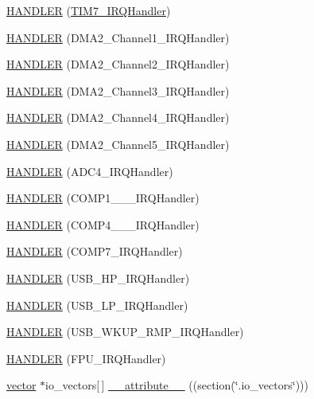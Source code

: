 \begin{DoxyCompactItemize}
\hyperlink{group___p_i_o_s_ga147fa8f18128bdddf9ee07691a5b00a3}{H\-A\-N\-D\-L\-E\-R} (\hyperlink{group___p_i_o_s___t_i_m_ga98cff83252098363b2dbca9608df964e}{T\-I\-M7\-\_\-\-I\-R\-Q\-Handler})
\item 
\hyperlink{group___p_i_o_s_ga6717e88a5b952955f7cbdf18a2407b0c}{H\-A\-N\-D\-L\-E\-R} (D\-M\-A2\-\_\-\-Channel1\-\_\-\-I\-R\-Q\-Handler)
\item 
\hyperlink{group___p_i_o_s_gaf2086766394e4d1b904c8c606332ee87}{H\-A\-N\-D\-L\-E\-R} (D\-M\-A2\-\_\-\-Channel2\-\_\-\-I\-R\-Q\-Handler)
\item 
\hyperlink{group___p_i_o_s_ga95ff74d750f8a2647ab624f233ec4546}{H\-A\-N\-D\-L\-E\-R} (D\-M\-A2\-\_\-\-Channel3\-\_\-\-I\-R\-Q\-Handler)
\item 
\hyperlink{group___p_i_o_s_gab5d0cd2c1bbe6a1eeaa91bc6b2c14ad9}{H\-A\-N\-D\-L\-E\-R} (D\-M\-A2\-\_\-\-Channel4\-\_\-\-I\-R\-Q\-Handler)
\item 
\hyperlink{group___p_i_o_s_ga1dc19efd10bf2b57f76e057d9658e34e}{H\-A\-N\-D\-L\-E\-R} (D\-M\-A2\-\_\-\-Channel5\-\_\-\-I\-R\-Q\-Handler)
\item 
\hyperlink{group___p_i_o_s_gaf4e7f7a30685280c61aeb5b7d8c00e25}{H\-A\-N\-D\-L\-E\-R} (A\-D\-C4\-\_\-\-I\-R\-Q\-Handler)
\item 
\hyperlink{group___p_i_o_s_ga6e46c1bfa9fb159be005578cbc9a51f8}{H\-A\-N\-D\-L\-E\-R} (C\-O\-M\-P1\-\_\-\_\-\_\-\-I\-R\-Q\-Handler)
\item 
\hyperlink{group___p_i_o_s_ga65ff2e4915c9602921fa55ee1b22ab95}{H\-A\-N\-D\-L\-E\-R} (C\-O\-M\-P4\-\_\-\_\-\_\-\-I\-R\-Q\-Handler)
\item 
\hyperlink{group___p_i_o_s_ga239a311cf01f1abba2e728f1be1019cf}{H\-A\-N\-D\-L\-E\-R} (C\-O\-M\-P7\-\_\-\-I\-R\-Q\-Handler)
\item 
\hyperlink{group___p_i_o_s_ga6fb28e184c11d412c0da98fdf5f85eb8}{H\-A\-N\-D\-L\-E\-R} (U\-S\-B\-\_\-\-H\-P\-\_\-\-I\-R\-Q\-Handler)
\item 
\hyperlink{group___p_i_o_s_gadc437f3a400a1fc9bc0bfe89c4be65f9}{H\-A\-N\-D\-L\-E\-R} (U\-S\-B\-\_\-\-L\-P\-\_\-\-I\-R\-Q\-Handler)
\item 
\hyperlink{group___p_i_o_s_gaa4d740a7c852a7547495df644d526cf7}{H\-A\-N\-D\-L\-E\-R} (U\-S\-B\-\_\-\-W\-K\-U\-P\-\_\-\-R\-M\-P\-\_\-\-I\-R\-Q\-Handler)
\item 
\hyperlink{group___p_i_o_s_gad4883dff4ea4e95dc98860af9735954b}{H\-A\-N\-D\-L\-E\-R} (F\-P\-U\-\_\-\-I\-R\-Q\-Handler)
\item 
\hyperlink{group___p_i_o_s_ga3c46a32d92954306e54f6e9acdd9eaac}{vector} $\ast$io\-\_\-vectors\mbox{[}$\,$\mbox{]} \hyperlink{group___p_i_o_s_ga8f4cc61b58aac9810254db781951ac28}{\-\_\-\-\_\-attribute\-\_\-\-\_\-} ((section(\char`\"{}.io\-\_\-vectors\char`\"{})))

\end{DoxyCompactItemize}

